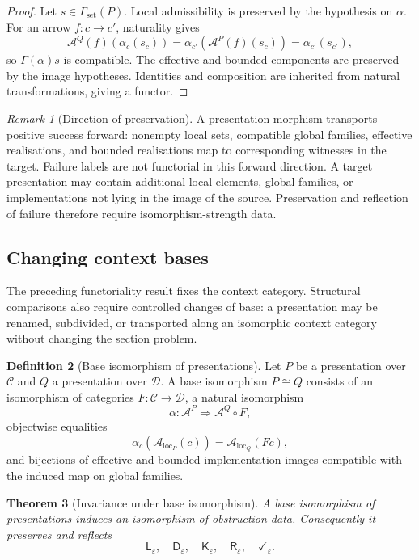 \documentclass[11pt]{article}
\theoremstyle{plain}
\newtheorem{theorem}{Theorem}[section]
\theoremstyle{definition}
\newtheorem{definition}[theorem]{Definition}
\theoremstyle{remark}
\newtheorem{remark}[theorem]{Remark}
\newcommand{\LocalAdm}{\mathcal{A}_{\mathrm{loc}}}
\newcommand{\eps}{\varepsilon}
\begin{document}
\begin{proof}
Let $s\in\Gamma_{\mathrm{set}}(P)$. Local admissibility is preserved by the
hypothesis on $\alpha$. For an arrow $f:c\to c'$, naturality gives
\[
\mathcal A^Q(f)(\alpha_c(s_c))
=\alpha_{c'}(\mathcal A^P(f)(s_c))
=\alpha_{c'}(s_{c'}),
\]
so $\Gamma(\alpha)s$ is compatible. The effective and bounded components are
preserved by the image hypotheses. Identities and composition are inherited from
natural transformations, giving a functor.
\end{proof}

\begin{remark}[Direction of preservation]
A presentation morphism transports positive success forward: nonempty local
sets, compatible global families, effective realisations, and bounded
realisations map to corresponding witnesses in the target. Failure labels are not
functorial in this forward direction. A target presentation may contain
additional local elements, global families, or implementations not lying in the
image of the source. Preservation and reflection of failure therefore require
isomorphism-strength data.
\end{remark}

\subsection{Changing context bases}

The preceding functoriality result fixes the context category. Structural
comparisons also require controlled changes of base: a presentation may be
renamed, subdivided, or transported along an isomorphic context category without
changing the section problem.

\begin{definition}[Base isomorphism of presentations]
\label{def:base-isomorphism-presentations}
Let $P$ be a presentation over $\mathcal C$ and $Q$ a presentation over
$\mathcal D$. A base isomorphism $P\cong Q$ consists of an isomorphism of
categories $F:\mathcal C\to\mathcal D$, a natural isomorphism
\[
\alpha:\mathcal A^P\Rightarrow \mathcal A^Q\circ F,
\]
objectwise equalities
\[
\alpha_c(\LocalAdm_P(c))=\LocalAdm_Q(Fc),
\]
and bijections of effective and bounded implementation images compatible with
the induced map on global families.
\end{definition}

\begin{theorem}[Invariance under base isomorphism]
\label{thm:base-isomorphism-invariance}
A base isomorphism of presentations induces an isomorphism of obstruction data.
Consequently it preserves and reflects
\[
\mathsf L_\eps,\quad \mathsf D_\eps,\quad \mathsf K_\eps,\quad
\mathsf R_\eps,\quad \checkmark_\eps .
\]
\end{theorem}
\end{document}

